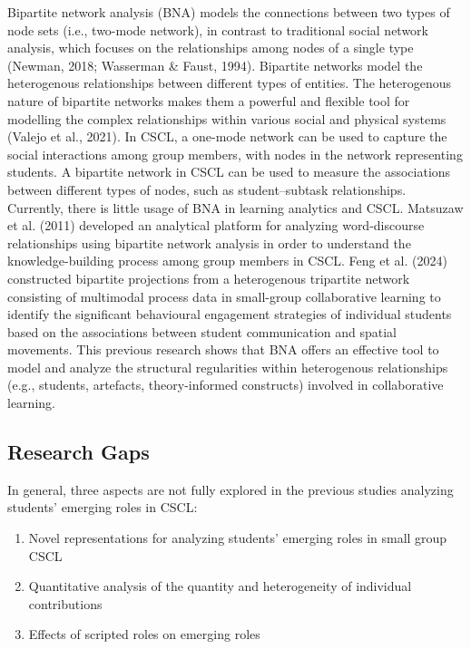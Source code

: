 Bipartite network analysis (BNA) models the connections between two types of node sets (i.e., two-mode network), in contrast to traditional social network analysis, which focuses on the relationships among nodes of a single type (Newman, 2018; Wasserman \& Faust, 1994). Bipartite networks model the heterogenous relationships between different types of entities. The heterogenous nature of bipartite networks makes them a powerful and flexible tool for modelling the complex relationships within various social and physical systems (Valejo et al., 2021). In CSCL, a one-mode network can be used to capture the social interactions among group members, with nodes in the network representing students. A bipartite network in CSCL can be used to measure the associations between different types of nodes, such as student–subtask relationships.\\

Currently, there is little usage of BNA in learning analytics and CSCL. Matsuzaw et al. (2011) developed an analytical platform for analyzing word-discourse relationships using bipartite network analysis in order to understand the knowledge-building process among group members in CSCL. Feng et al. (2024) constructed bipartite projections from a heterogenous tripartite network consisting of multimodal process data in small-group collaborative learning to identify the significant behavioural engagement strategies of individual students based on the associations between student communication and spatial movements. This previous research shows that BNA offers an effective tool to model and analyze the structural regularities within heterogenous relationships (e.g., students, artefacts, theory-informed constructs) involved in collaborative learning.


\subsection{Research Gaps}

\noindent In general, three aspects are not fully explored in the previous studies analyzing students’ emerging roles in CSCL:
\begin{enumerate}
    \item Novel representations for analyzing students’ emerging roles in small group CSCL
    \item Quantitative analysis of the quantity and heterogeneity of individual contributions
    \item Effects of scripted roles on emerging roles
\end{enumerate}

